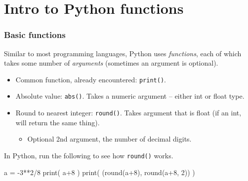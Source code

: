 \documentclass{beamer}
\newenvironment{codeblock}
    {\hfill\begin{beamerboxesrounded}[lower=codecol, width=0.8\textwidth]
    \medskip

    }
    { 
    \end{beamerboxesrounded}\hfill
    }
\theoremstyle{example}
\newcommand{\ttt}[1]{{\small\texttt{#1}}}
\begin{document}
\section{Intro to Python functions}

\begin{frame}[fragile]
\frametitle{Basic functions}

Similar to most programming languages, Python uses \emph{functions}, each of which takes some number of \emph{arguments} (sometimes an argument is optional).

\begin{itemize}
	\item Common function, already encountered: \ttt{print()}.
	\item Absolute value: \ttt{abs()}. Takes a numeric argument {--} either {\ttb int} or {\ttb float} type.
	\item Round to nearest integer: \ttt{round()}. Takes argument that is {\ttb float} (if an {\ttb int}, will return the same thing).
	\begin{itemize}
		\item Optional 2nd argument, the number of decimal digits.
	\end{itemize}
\end{itemize}
In Python, run the following to see how \ttt{round()} works.

\begin{codeblock}

\begin{python}
a = -3**2/8
print( a+8 )
print( (round(a+8), round(a+8, 2)) )
\end{python}

\end{codeblock}

\end{frame}
\end{document}

